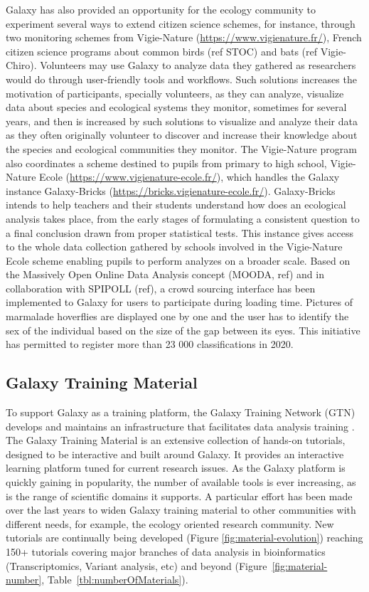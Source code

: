 \documentclass[10pt,letterpaper]{article}
\begin{document}
Galaxy has also provided an opportunity for the ecology community to experiment several ways to extend citizen science schemes, for instance, through two monitoring schemes from Vigie-Nature (\url{https://www.vigienature.fr/}), French citizen science programs about common birds (ref STOC) and bats (ref Vigie-Chiro). Volunteers may use Galaxy to analyze data they gathered as researchers would do through user-friendly tools and workflows. Such solutions increases the motivation of participants, specially volunteers, as they can analyze, visualize data about species and ecological systems they monitor, sometimes for several years, and then is increased by such solutions to visualize and analyze their data as they often originally volunteer to discover and increase their knowledge about the species and ecological communities they monitor.
The Vigie-Nature program also coordinates a scheme destined to pupils from primary to high school, Vigie-Nature Ecole (\url{https://www.vigienature-ecole.fr/}), which handles the Galaxy instance Galaxy-Bricks (\url{https://bricks.vigienature-ecole.fr/}). Galaxy-Bricks intends to help teachers and their students understand how does an ecological analysis takes place, from the early stages of formulating a consistent question to a final conclusion drawn from proper statistical tests. This instance gives access to the whole data collection gathered by schools involved in the Vigie-Nature Ecole scheme enabling pupils to perform analyzes on a broader scale.
Based on the Massively Open Online Data Analysis concept (MOODA, ref) and in collaboration with SPIPOLL (ref), a crowd sourcing interface has been implemented to Galaxy for users to participate during loading time. Pictures of marmalade hoverflies are displayed one by one and the user has to identify the sex of the individual based on the size of the gap between its eyes. This initiative has permitted to register more than 23 000 classifications in 2020.

\subsection*{Galaxy Training Material}

To support Galaxy as a training platform, the Galaxy Training Network (GTN) develops and maintains an infrastructure that facilitates data analysis training \cite{Batut2018}. The Galaxy Training Material is an extensive collection of hands-on tutorials, designed to be interactive and built around Galaxy. It provides an interactive learning platform tuned for current research issues. As the Galaxy platform is quickly gaining in popularity, the number of available tools is ever increasing, as is the range of scientific domains it supports. A particular effort has been made over the last years to widen Galaxy training material to other communities with different needs, for example, the ecology oriented research community. New tutorials are continually being developed (Figure \ref{fig:material-evolution}) reaching 150+ tutorials covering major branches of data analysis in bioinformatics (Transcriptomics, Variant analysis, etc) and beyond (Figure~\ref{fig:material-number}, Table~\ref{tbl:numberOfMaterials}). 
\end{document}
